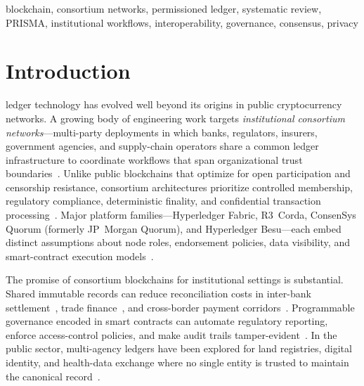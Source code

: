 \documentclass[journal]{IEEEtran}
\begin{document}
\begin{IEEEkeywords}
blockchain, consortium networks, permissioned ledger, systematic review, PRISMA, institutional workflows, interoperability, governance, consensus, privacy
\end{IEEEkeywords}

\section{Introduction}
\label{sec:introduction}

 ledger technology has evolved well beyond its origins in public cryptocurrency networks.
A growing body of engineering work targets \emph{institutional consortium networks}---multi-party deployments in which banks, regulators, insurers, government agencies, and supply-chain operators share a common ledger infrastructure to coordinate workflows that span organizational trust boundaries~\cite{xu2017taxonomy,belotti2019vademecum,casino2019systematic}.
Unlike public blockchains that optimize for open participation and censorship resistance, consortium architectures prioritize controlled membership, regulatory compliance, deterministic finality, and confidential transaction processing~\cite{hyperledger2018arch,cachin2016architecture}.
Major platform families---Hyperledger Fabric, R3~Corda, ConsenSys Quorum (formerly JP~Morgan Quorum), and Hyperledger Besu---each embed distinct assumptions about node roles, endorsement policies, data visibility, and smart-contract execution models~\cite{androulaki2018hyperledger,brown2016corda,baliga2018performance}.

The promise of consortium blockchains for institutional settings is substantial.
Shared immutable records can reduce reconciliation costs in inter-bank settlement~\cite{guo2016blockchain}, trade finance~\cite{chang2020supplychain}, and cross-border payment corridors~\cite{danezis2015centrally}.
Programmable governance encoded in smart contracts can automate regulatory reporting, enforce access-control policies, and make audit trails tamper-evident~\cite{defilippi2018blockchain}.
In the public sector, multi-agency ledgers have been explored for land registries, digital identity, and health-data exchange where no single entity is trusted to maintain the canonical record~\cite{ølnes2017blockchain,mcghin2019blockchain}.
\end{document}
